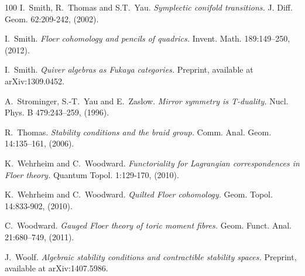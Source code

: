 \begin{thebibliography}{100}
I.~Smith, R.~Thomas and S.T.~Yau.
\emph{Symplectic conifold transitions.}
J. Diff. Geom. 62:209-242, (2002).

I.~Smith.
\emph{Floer cohomology and pencils of quadrics.}
Invent. Math. 189:149--250, (2012).

I.~Smith.
\emph{Quiver algebras as Fukaya categories.}
Preprint, available at arXiv:1309.0452.

A.~Strominger, S.-T.~Yau and E.~Zaslow.
\emph{Mirror symmetry is T-duality.}
Nucl. Phys. B 479:243--259, (1996).

R.~Thomas.
\emph{Stability conditions and the braid group.}
Comm. Anal. Geom. 14:135--161, (2006).

K.~Wehrheim and C.~Woodward.
\emph{Functoriality for Lagrangian correspondences in Floer theory.}
Quantum Topol. 1:129-170, (2010).

K.~Wehrheim and C.~Woodward.
\emph{Quilted Floer cohomology.}
Geom. Topol. 14:833-902, (2010).

C.~Woodward.
\emph{Gauged Floer theory of toric moment fibres.}
Geom. Funct. Anal. 21:680--749, (2011).

J.~Woolf.
\emph{Algebraic stability conditions and contractible stability spaces.}
Preprint, available at arXiv:1407.5986.

\end{thebibliography}
